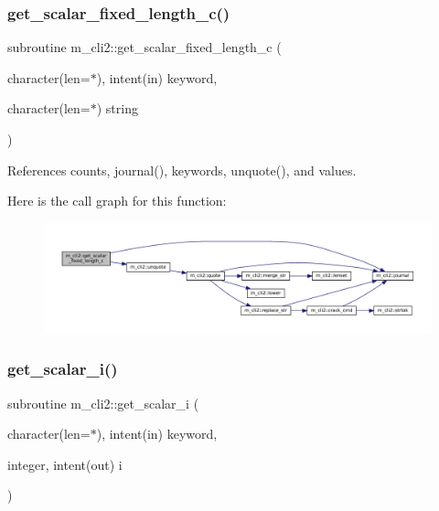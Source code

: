 \subsubsection{\texorpdfstring{get\+\_\+scalar\+\_\+fixed\+\_\+length\+\_\+c()}{get\_scalar\_fixed\_length\_c()}}
{\footnotesize\ttfamily subroutine m\+\_\+cli2\+::get\+\_\+scalar\+\_\+fixed\+\_\+length\+\_\+c (\begin{DoxyParamCaption}\item[{character(len=$\ast$), intent(in)}]{keyword,  }\item[{character(len=$\ast$)}]{string }\end{DoxyParamCaption})\hspace{0.3cm}{\ttfamily [private]}}



References counts, journal(), keywords, unquote(), and values.

Here is the call graph for this function\+:\nopagebreak
\begin{figure}[H]
\begin{center}
\leavevmode
\includegraphics[width=350pt]{namespacem__cli2_a9dcc99d34db1771959a1461274ae073e_cgraph}
\end{center}
\end{figure}
\mbox{\label{namespacem__cli2_a9c5208ef6763da7e68dd1e118bea0b7a}} 
\subsubsection{\texorpdfstring{get\+\_\+scalar\+\_\+i()}{get\_scalar\_i()}}
{\footnotesize\ttfamily subroutine m\+\_\+cli2\+::get\+\_\+scalar\+\_\+i (\begin{DoxyParamCaption}\item[{character(len=$\ast$), intent(in)}]{keyword,  }\item[{integer, intent(out)}]{i }\end{DoxyParamCaption})\hspace{0.3cm}{\ttfamily [private]}}



